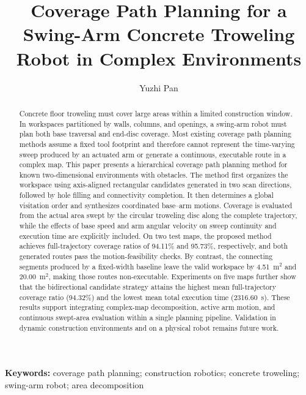 \documentclass[a4paper,11pt]{article}
\title{Coverage Path Planning for a Swing-Arm Concrete Troweling Robot in Complex Environments}
\author{Yuzhi Pan}
\date{}
\begin{document}
\maketitle

\begin{abstract}
Concrete floor troweling must cover large areas within a limited construction window. In workspaces partitioned by walls, columns, and openings, a swing-arm robot must plan both base traversal and end-disc coverage. Most existing coverage path planning methods assume a fixed tool footprint and therefore cannot represent the time-varying sweep produced by an actuated arm or generate a continuous, executable route in a complex map. This paper presents a hierarchical coverage path planning method for known two-dimensional environments with obstacles. The method first organizes the workspace using axis-aligned rectangular candidates generated in two scan directions, followed by hole filling and connectivity completion. It then determines a global visitation order and synthesizes coordinated base--arm motions. Coverage is evaluated from the actual area swept by the circular troweling disc along the complete trajectory, while the effects of base speed and arm angular velocity on sweep continuity and execution time are explicitly included. On two test maps, the proposed method achieves full-trajectory coverage ratios of 94.11\% and 95.73\%, respectively, and both generated routes pass the motion-feasibility checks. By contrast, the connecting segments produced by a fixed-width baseline leave the valid workspace by 4.51~m$^2$ and 20.00~m$^2$, making those routes non-executable. Experiments on five maps further show that the bidirectional candidate strategy attains the highest mean full-trajectory coverage ratio (94.32\%) and the lowest mean total execution time (2316.60~s). These results support integrating complex-map decomposition, active arm motion, and continuous swept-area evaluation within a single planning pipeline. Validation in dynamic construction environments and on a physical robot remains future work.
\end{abstract}

\noindent\textbf{Keywords:} coverage path planning; construction robotics; concrete troweling; swing-arm robot; area decomposition






\nocite{*}

\begingroup
\small

\endgroup
\end{document}
